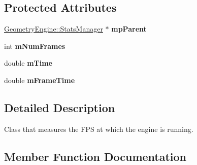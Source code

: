 \subsection*{Protected Attributes}
\begin{DoxyCompactItemize}
\item 
\mbox{\label{class_geometry_engine_1_1_geometry_statistics_1_1_f_p_s_measure_a63a8ef87b100ab333a6e9a88d174d54c}} 
\mbox{\hyperlink{class_geometry_engine_1_1_stats_manager}{Geometry\+Engine\+::\+Stats\+Manager}} $\ast$ {\bfseries mp\+Parent}
\item 
\mbox{\label{class_geometry_engine_1_1_geometry_statistics_1_1_f_p_s_measure_a041e1ca2802c707e4ab86eb6661bea48}} 
int {\bfseries m\+Num\+Frames}
\item 
\mbox{\label{class_geometry_engine_1_1_geometry_statistics_1_1_f_p_s_measure_ac0cf5348a916096260708a5adf420d43}} 
double {\bfseries m\+Time}
\item 
\mbox{\label{class_geometry_engine_1_1_geometry_statistics_1_1_f_p_s_measure_a3b8bfcb47b470184e4aa4d4d78ea6f40}} 
double {\bfseries m\+Frame\+Time}
\end{DoxyCompactItemize}


\subsection{Detailed Description}
Class that measures the F\+PS at which the engine is running. 

\subsection{Member Function Documentation}
\mbox{\label{class_geometry_engine_1_1_geometry_statistics_1_1_f_p_s_measure_af6a9254c6b4b0fdf327b716d490a8d67}} 
